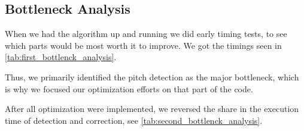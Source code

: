\documentclass[sigconf]{acmart}
\begin{document}
    \subsection{Bottleneck Analysis}
    When we had the algorithm up and running we did early timing tests, to see which parts would be most worth it to improve.
    We got the timings seen in \autoref{tab:first_bottlenck_analysis}.
    \begin{table}[htbp]   
        \caption{First bottleneck analysis on a \SI{15}{\second} sound file, with a detection range of $[\SI{20}{Hz}, \SI{2}{\kilo Hz}]$.}
        \label{tab:first_bottlenck_analysis}

    \end{table}

    Thus, we primarily identified the pitch detection as the major bottleneck, which is why we focused our optimization efforts on that part of the code.

    After all optimization were implemented, we reversed the share in the execution time of detection and correction, see \autoref{tab:second_bottlenck_analysis}.
\end{document}
